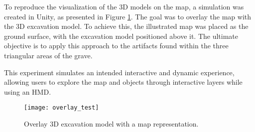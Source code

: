 To reproduce the visualization of the \gls{3D} models on the map, a simulation was created in Unity, as presented in Figure \ref{fig:overlay}. The goal was to overlay the map with the \gls{3D} excavation model.
To achieve this, the illustrated map was placed as the ground surface, with the excavation model positioned above it. The ultimate objective is to apply this approach to the artifacts found within the three triangular areas of the grave.

This experiment simulates an intended interactive and dynamic experience, allowing users to explore the map and objects through interactive layers while using an \gls{HMD}.


\begin{figure}[h]
    \centering
    \texttt{[image: overlay\_test]}
    \caption{Overlay \gls{3D} excavation model with a map representation.}
    \label{fig:overlay}
\end{figure}


